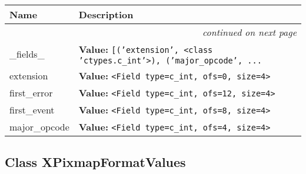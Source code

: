     \vspace{-1cm}
\hspace{\varindent}\begin{longtable}{|p{\varnamewidth}|p{\vardescrwidth}|l}
\cline{1-2}
\cline{1-2} \centering \textbf{Name} & \centering \textbf{Description}& \\
\cline{1-2}
\endhead\cline{1-2}\multicolumn{3}{r}{\small\textit{continued on next page}}\\\endfoot\cline{1-2}
\endlastfoot\raggedright \_\-f\-i\-e\-l\-d\-s\-\_\- & \raggedright \textbf{Value:} 
{\tt \texttt{[}\texttt{(}\texttt{'}\texttt{extension}\texttt{'}\texttt{, }{\textless}class 'ctypes.c\_int'{\textgreater}\texttt{)}\texttt{, }\texttt{(}\texttt{'}\texttt{major\_opcode}\texttt{'}\texttt{, }\texttt{...}}&\\
\cline{1-2}
\raggedright e\-x\-t\-e\-n\-s\-i\-o\-n\- & \raggedright \textbf{Value:} 
{\tt {\textless}Field type=c\_int, ofs=0, size=4{\textgreater}}&\\
\cline{1-2}
\raggedright f\-i\-r\-s\-t\-\_\-e\-r\-r\-o\-r\- & \raggedright \textbf{Value:} 
{\tt {\textless}Field type=c\_int, ofs=12, size=4{\textgreater}}&\\
\cline{1-2}
\raggedright f\-i\-r\-s\-t\-\_\-e\-v\-e\-n\-t\- & \raggedright \textbf{Value:} 
{\tt {\textless}Field type=c\_int, ofs=8, size=4{\textgreater}}&\\
\cline{1-2}
\raggedright m\-a\-j\-o\-r\-\_\-o\-p\-c\-o\-d\-e\- & \raggedright \textbf{Value:} 
{\tt {\textless}Field type=c\_int, ofs=4, size=4{\textgreater}}&\\
\cline{1-2}
\end{longtable}



\subsection{Class XPixmapFormatValues}

